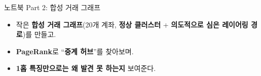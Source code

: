 \begin{frame}{노트북 Part 2: 합성 거래 그래프}
  \begin{itemize}
    \item 작은 \textbf{합성 거래 그래프}(20개 계좌, \textbf{정상
      클러스터} + \textbf{의도적으로 심은 레이어링 경로})를
      만들고.
    \item \textbf{PageRank}로 ``\textbf{중계 허브}''를 찾아보며.
    \item \textbf{1홉 특징만으로는 왜 발견 못 하는지} 보여준다.
  \end{itemize}
\end{frame}
